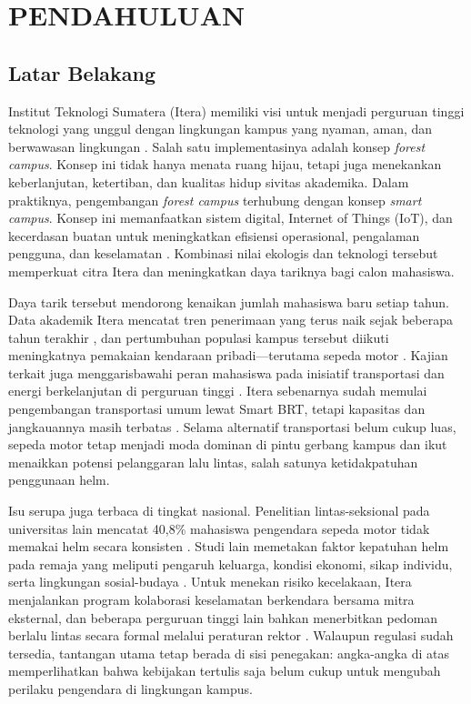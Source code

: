 \chapter{PENDAHULUAN}

\section{Latar Belakang}
\label{section:latarbelakang}

Institut Teknologi Sumatera (Itera) memiliki visi untuk menjadi perguruan
tinggi teknologi yang unggul dengan lingkungan kampus yang nyaman, aman, dan
berwawasan lingkungan \cite{itera2019renstra}. Salah satu implementasinya
adalah konsep \textit{forest campus}. Konsep ini tidak hanya menata ruang
hijau, tetapi juga menekankan keberlanjutan, ketertiban, dan kualitas hidup
sivitas akademika. Dalam praktiknya, pengembangan \textit{forest campus}
terhubung dengan konsep \textit{smart campus}. Konsep ini memanfaatkan sistem
digital, Internet of Things (IoT), dan kecerdasan buatan untuk meningkatkan
efisiensi operasional, pengalaman pengguna, dan keselamatan
\cite{Polin2023SmartCampus}. Kombinasi nilai ekologis dan teknologi tersebut
memperkuat citra Itera dan meningkatkan daya tariknya bagi calon mahasiswa.

Daya tarik tersebut mendorong kenaikan jumlah mahasiswa baru setiap tahun. Data akademik Itera mencatat tren penerimaan yang terus naik sejak beberapa tahun terakhir \cite{itera2025dashboard}, dan pertumbuhan populasi kampus tersebut diikuti meningkatnya pemakaian kendaraan pribadi---terutama sepeda motor \cite{purwanti2018analisisitenas}. Kajian terkait juga menggarisbawahi peran mahasiswa pada inisiatif transportasi dan energi berkelanjutan di perguruan tinggi \cite{rachmadian2024kesadaran}. Itera sebenarnya sudah memulai pengembangan transportasi umum lewat Smart BRT, tetapi kapasitas dan jangkauannya masih terbatas \cite{antaranews2025brt}. Selama alternatif transportasi belum cukup luas, sepeda motor tetap menjadi moda dominan di pintu gerbang kampus dan ikut menaikkan potensi pelanggaran lalu lintas, salah satunya ketidakpatuhan penggunaan helm.

Isu serupa juga terbaca di tingkat nasional. Penelitian lintas-seksional pada universitas lain mencatat 40,8\% mahasiswa pengendara sepeda motor tidak memakai helm secara konsisten \cite{safitri2020gambaran}. Studi lain memetakan faktor kepatuhan helm pada remaja yang meliputi pengaruh keluarga, kondisi ekonomi, sikap individu, serta lingkungan sosial-budaya \cite{nobrihas2023kepatuhan}. Untuk menekan risiko kecelakaan, Itera menjalankan program kolaborasi keselamatan berkendara bersama mitra eksternal, dan beberapa perguruan tinggi lain bahkan menerbitkan pedoman berlalu lintas secara formal melalui peraturan rektor \cite{iteranews2024kolaborasi,its2025pedoman}. Walaupun regulasi sudah tersedia, tantangan utama tetap berada di sisi penegakan: angka-angka di atas memperlihatkan bahwa kebijakan tertulis saja belum cukup untuk mengubah perilaku pengendara di lingkungan kampus.

